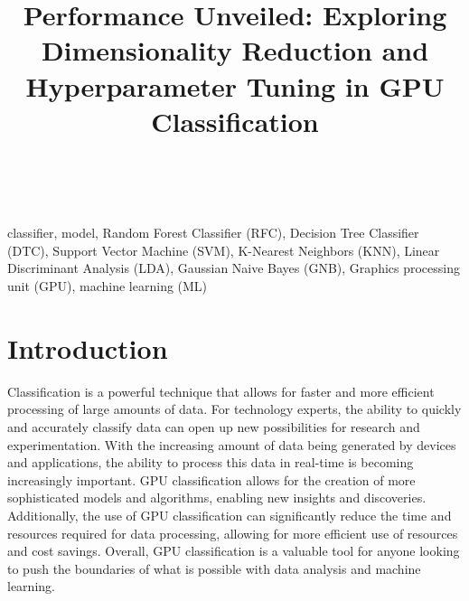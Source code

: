 \documentclass[conference,onecolumn]{IEEEtran}
\begin{document}
\title{Performance Unveiled: Exploring Dimensionality Reduction and Hyperparameter Tuning in GPU Classification}

\author{\\

}

\maketitle

\begin{abstract}

\end{abstract}

\begin{IEEEkeywords}
classifier, model, Random Forest Classifier (RFC), Decision Tree Classifier (DTC), Support Vector Machine (SVM), K-Nearest Neighbors (KNN), Linear Discriminant Analysis (LDA), Gaussian Naive Bayes (GNB), Graphics processing unit (GPU), machine learning (ML)
\end{IEEEkeywords}

\newpage
\tableofcontents

\newpage
\section{Introduction}
Classification is a powerful technique that allows for faster and more efficient processing of large amounts of data. For technology experts, the ability to quickly and accurately classify data can open up new possibilities for research and experimentation. With the increasing amount of data being generated by devices and applications, the ability to process this data in real-time is becoming increasingly important. GPU classification allows for the creation of more sophisticated models and algorithms, enabling new insights and discoveries. Additionally, the use of GPU classification can significantly reduce the time and resources required for data processing, allowing for more efficient use of resources and cost savings. Overall, GPU classification is a valuable tool for anyone looking to push the boundaries of what is possible with data analysis and machine learning.
\end{document}
